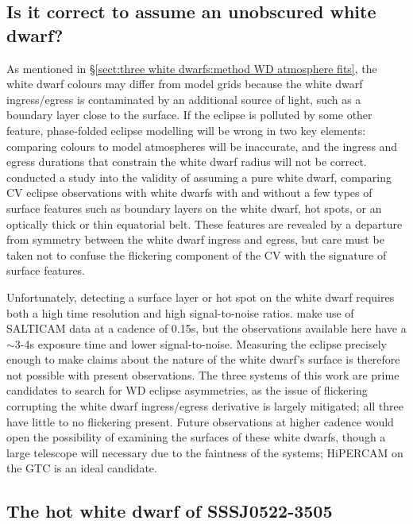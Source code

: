 \subsection{Is it correct to assume an unobscured white dwarf?}
\label{sect:impure white dwarf discussion}

As mentioned in \S\ref{sect:three white dwarfs:method WD atmosphere fits}, the white dwarf colours may differ from model grids because the white dwarf ingress/egress is contaminated by an additional source of light, such as a boundary layer close to the surface.
If the eclipse is polluted by some other feature, phase-folded eclipse modelling will be wrong in two key elements: comparing colours to model atmospheres will be inaccurate, and the ingress and egress durations that constrain the white dwarf radius will not be correct.
\citet{Spark2015} conducted a study into the validity of assuming a pure white dwarf, comparing CV eclipse observations with white dwarfs with and without a few types of surface features such as boundary layers on the white dwarf, hot spots, or an optically thick or thin equatorial belt.
These features are revealed by a departure from symmetry between the white dwarf ingress and egress, but care must be taken not to confuse the flickering component of the CV with the signature of surface features.

Unfortunately, detecting a surface layer or hot spot on the white dwarf requires both a high time resolution and high signal-to-noise ratios. \citet{Spark2015} make use of SALTICAM data at a cadence of 0.15s, but the observations available here have a $\sim$3-4s exposure time and lower signal-to-noise. Measuring the eclipse precisely enough to make claims about the nature of the white dwarf's surface is therefore not possible with present observations.
The three systems of this work are prime candidates to search for WD eclipse asymmetries, as the issue of flickering corrupting the white dwarf ingress/egress derivative is largely mitigated; all three have little to no flickering present.
Future observations at higher cadence would open the possibility of examining the surfaces of these white dwarfs, though a large telescope will necessary due to the faintness of the systems; HiPERCAM on the GTC is an ideal candidate.


\subsection{The hot white dwarf of SSSJ0522-3505}
\label{sect:SSSJ0522-3505 white dwarf temperature discussion}

